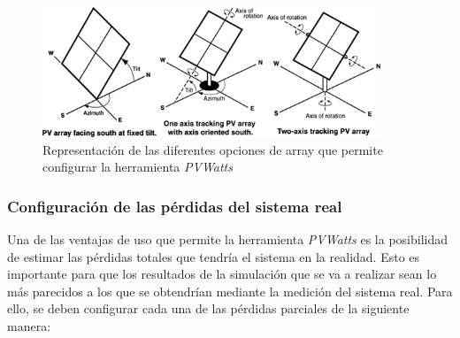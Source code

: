 \begin{figure}[H]
    \centering
    \includegraphics[width=0.9\textwidth]{img/diseno/array.png}
    \caption{Representación de las diferentes opciones de array que permite configurar la herramienta \textit{PVWatts} \cite{pvwatts}}
    \label{fig:array}
\end{figure}

\subsubsection{Configuración de las pérdidas del sistema real}

Una de las ventajas de uso que permite la herramienta \textit{PVWatts} es la posibilidad de estimar las pérdidas totales que tendría el sistema en la realidad. Esto es importante para que los resultados de la simulación que se va a realizar sean lo más parecidos a los que se obtendrían mediante la medición del sistema real. Para ello, se deben configurar cada una de las pérdidas parciales de la siguiente manera:


